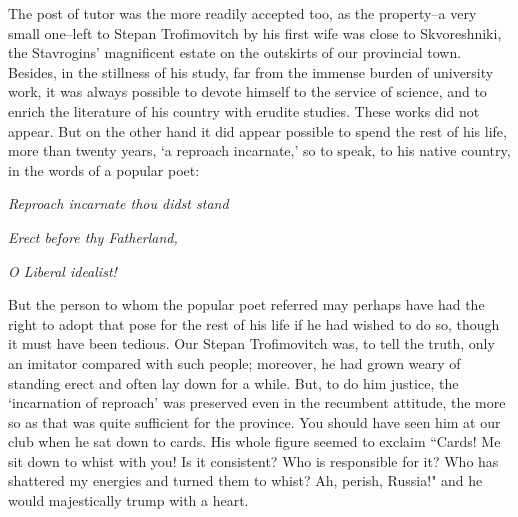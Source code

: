 \documentclass[12pt]{article}
\begin{document}
\vspace{12pt}
The post of tutor was the more readily accepted too, as the property--a
very small one--left to Stepan Trofimovitch by his first wife was close
to Skvoreshniki, the Stavrogins' magnificent estate on the outskirts of
our provincial town. Besides, in the stillness of his study, far from
the immense burden of university work, it was always possible to devote
himself to the service of science, and to enrich the literature of his
country with erudite studies. These works did not appear. But on the
other hand it did appear possible to spend the rest of his life, more
than twenty years, `a reproach incarnate,' so to speak, to his native
country, in the words of a popular poet:


\vspace{12pt}
\emph{Reproach incarnate thou didst stand}


\emph{Erect before thy Fatherland,}


\emph{O Liberal idealist!}




\vspace{12pt}
But the person to whom the popular poet referred may perhaps have had
the right to adopt that pose for the rest of his life if he had wished
to do so, though it must have been tedious. Our Stepan Trofimovitch was,
to tell the truth, only an imitator compared with such people; moreover,
he had grown weary of standing erect and often lay down for a while.
But, to do him justice, the `incarnation of reproach' was preserved even
in the recumbent attitude, the more so as that was quite sufficient for
the province. You should have seen him at our club when he sat down to
cards. His whole figure seemed to exclaim ``Cards! Me sit down to whist
with you! Is it consistent? Who is responsible for it? Who has shattered
my energies and turned them to whist? Ah, perish, Russia!" and he would
majestically trump with a heart.
\end{document}

